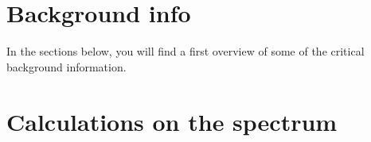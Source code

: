 \documentclass[12pt,a4paper]{article}
\numberwithin{equation}{section}
\numberwithin{figure}{section}
\numberwithin{table}{section}
\begin{document}
\section{Background info}
In the sections below, you will find a first overview of some of the critical background information.






\section{Calculations on the spectrum} %
\label{sec:calculations_on_the_spectrum}









\vspace{2cm}
%
%
\printbibliography
%
%
%
\end{document}
